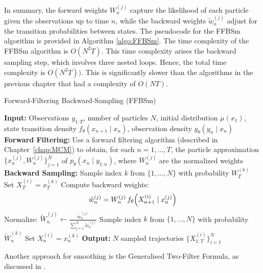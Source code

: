 In summary, the forward weights \(W_n^{(j)}\) capture the likelihood of each particle given the observations up to time \(n\), while the backward weights \(\tilde{w}_n^{(j)}\) adjust for the transition probabilities between states. 
The pseudocode for the FFBSm algorithm is provided in Algorithm \ref{algo:FFBSm}. The time complexity of the FFBSm algorithm is \(O(N^2T)\). This time complexity arises the backward sampling step, which involves three nested loops. Hence, the total time complexity is \(O(N^2T))\). This is significantly slower than the algorithms in the previous chapter that had a complexity of \(O(NT)\).
\begin{algorithm}[H]
	\caption{Forward-Filtering Backward-Sampling (FFBSm)}
	\label{algo:FFBSm}
	\begin{algorithmic}[1]
		\State \textbf{Input:} Observations \(y_{1:T}\), number of particles \(N\), initial distribution \(\mu(x_1)\), state transition density \(f_\theta(x_{n+1}\mid x_n)\), observation density \(g_\theta(y_n\mid x_n)\)
		\State \textbf{Forward Filtering:} 
		\State Use a forward filtering algorithm (described in Chapter~\ref{chap:MCM}) to obtain, for each \(n=1,\dots,T\), the particle approximation \(\{x_n^{(j)}, W_n^{(j)}\}_{j=1}^N\) of \(p_\theta(x_n\mid y_{1:n})\), where \( W_n^{(j)} \) are the normalized weights
		\State \textbf{Backward Sampling:}
		\State Sample index \(k\) from \(\{1,\dots,N\}\) with probability \(W_T^{(k)}\)
		\State Set \(X_T^{(i)} = x_T^{(k)}\)
		\State Compute backward weights:
		\[
		\tilde{w}_n^{(j)} = W_n^{(j)}\, f_\theta\Bigl(X_{n+1}^{(i)}\mid x_n^{(j)}\Bigr)
		\]
		\EndFor
		\State Normalize: \( \tilde{W}_n^{(j)} \leftarrow \frac{\tilde{w}_n^{(j)}}{\sum_{j=1}^N \tilde{w}_n^{(j)}} \)
		\State Sample index \(k\) from \(\{1,\dots,N\}\) with probability \(\tilde{W}_n^{(k)}\)
		\State Set \(X_n^{(i)} = x_n^{(k)}\)
		\EndFor
		\EndFor
		\State \textbf{Output:} \(N\) sampled trajectories \(\{X_{1:T}^{(i)}\}_{i=1}^N\)
	\end{algorithmic}
\end{algorithm}

Another approach for smoothing is the Generalised Two-Filter Formula, as discussed in \cite{BRESLER01021986}.

